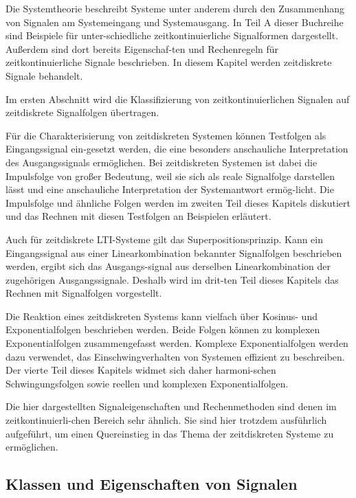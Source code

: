 Die Systemtheorie beschreibt Systeme unter anderem durch den Zusammenhang von Signalen am Systemeingang und Systemausgang. In Teil A dieser Buchreihe sind Beispiele für unter-schiedliche zeitkontinuierliche Signalformen dargestellt. Außerdem sind dort bereits Eigenschaf-ten und Rechenregeln für zeitkontinuierliche Signale beschrieben. In diesem Kapitel werden zeitdiskrete Signale behandelt. \medskip

\noindent Im ersten Abschnitt wird die Klassifizierung von zeitkontinuierlichen Signalen auf zeitdiskrete Signalfolgen übertragen. \medskip

\noindent Für die Charakterisierung von zeitdiskreten Systemen können Testfolgen als Eingangssignal ein-gesetzt werden, die eine besonders anschauliche Interpretation des Ausgangssignals ermöglichen. Bei zeitdiskreten Systemen ist dabei die Impulsfolge von großer Bedeutung, weil sie sich als reale Signalfolge darstellen lässt und eine anschauliche Interpretation der Systemantwort ermög-licht. Die Impulsfolge und ähnliche Folgen werden im zweiten Teil dieses Kapitels diskutiert und das Rechnen mit diesen Testfolgen an Beispielen erläutert.\medskip

\noindent Auch für zeitdiskrete LTI-Systeme gilt das Superpositionsprinzip. Kann ein Eingangssignal aus einer Linearkombination bekannter Signalfolgen beschrieben werden, ergibt sich das Ausgangs-signal aus derselben Linearkombination der zugehörigen Ausgangssignale. Deshalb wird im drit-ten Teil dieses Kapitels das Rechnen mit Signalfolgen vorgestellt.\medskip

\noindent Die Reaktion eines zeitdiskreten Systems kann vielfach über Kosinus- und Exponentialfolgen beschrieben werden. Beide Folgen können zu komplexen Exponentialfolgen zusammengefasst werden. Komplexe Exponentialfolgen werden dazu verwendet, das Einschwingverhalten von Systemen effizient zu beschreiben. Der vierte Teil dieses Kapitels widmet sich daher harmoni-schen Schwingungsfolgen sowie reellen und komplexen Exponentialfolgen.\medskip

\noindent Die hier dargestellten Signaleigenschaften und Rechenmethoden sind denen im zeitkontinuierli-chen Bereich sehr ähnlich. Sie sind hier trotzdem ausführlich aufgeführt, um einen Quereinstieg in das Thema der zeitdiskreten Systeme zu ermöglichen.

\subsection{Klassen und Eigenschaften von Signalen}

